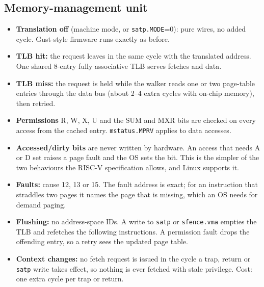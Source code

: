 \documentclass[10pt,a4paper]{article}
\newcommand{\code}[1]{\texttt{#1}}
\begin{document}
\subsection{Memory-management unit}
\begin{itemize}
\item \textbf{Translation off} (machine mode, or \code{satp.MODE}=0): pure wires, no added cycle. Gust-style firmware runs exactly as before.
\item \textbf{TLB hit:} the request leaves in the same cycle with the translated address. One shared 8-entry fully associative TLB serves fetches and data.
\item \textbf{TLB miss:} the request is held while the walker reads one or two page-table entries through the data bus (about 2--4 extra cycles with on-chip memory), then retried.
\item \textbf{Permissions} R, W, X, U and the SUM and MXR bits are checked on every access from the cached entry. \code{mstatus.MPRV} applies to data accesses.
\item \textbf{Accessed/dirty bits} are never written by hardware. An access that needs A or D set raises a page fault and the OS sets the bit. This is the simpler of the two behaviours the RISC-V specification allows, and Linux supports it.
\item \textbf{Faults:} cause 12, 13 or 15. The fault address is exact; for an instruction that straddles two pages it names the page that is missing, which an OS needs for demand paging.
\item \textbf{Flushing:} no address-space IDs. A write to \code{satp} or \code{sfence.vma} empties the TLB and refetches the following instructions. A permission fault drops the offending entry, so a retry sees the updated page table.
\item \textbf{Context changes:} no fetch request is issued in the cycle a trap, return or \code{satp} write takes effect, so nothing is ever fetched with stale privilege. Cost: one extra cycle per trap or return.
\end{itemize}
\end{document}
